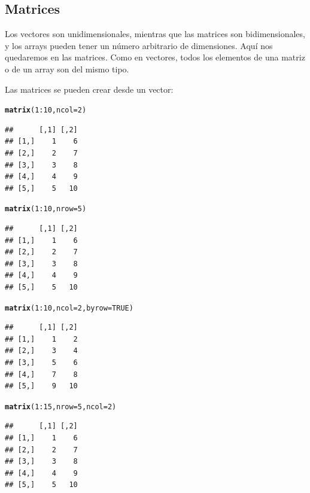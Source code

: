 \documentclass{config/apuntes}\usepackage[]{graphicx}\usepackage[]{xcolor}
\makeatletter
\newcommand{\hlnum}[1]{\textcolor[rgb]{0.686,0.059,0.569}{#1}}%
\newcommand{\hlopt}[1]{\textcolor[rgb]{0,0,0}{#1}}%
\newcommand{\hldef}[1]{\textcolor[rgb]{0.345,0.345,0.345}{#1}}%
\newcommand{\hlkwc}[1]{\textcolor[rgb]{0.333,0.667,0.333}{#1}}%
\newcommand{\hlkwd}[1]{\textcolor[rgb]{0.737,0.353,0.396}{\textbf{#1}}}%
\newenvironment{kframe}{%
 \def\at@end@of@kframe{}%
 \ifinner\ifhmode%
  \def\at@end@of@kframe{\end{minipage}}%
  \begin{minipage}{\columnwidth}%
 \fi\fi%
 \def\FrameCommand##1{\hskip\@totalleftmargin \hskip-\fboxsep
 \colorbox{shadecolor}{##1}\hskip-\fboxsep
     \hskip-\linewidth \hskip-\@totalleftmargin \hskip\columnwidth}%
 \MakeFramed {\advance\hsize-\width
   \@totalleftmargin\z@ \linewidth\hsize
   \@setminipage}}%
 {\par\unskip\endMakeFramed%
 \at@end@of@kframe}
\newenvironment{knitrout}{}{} %
\makeatother
\begin{document}
\subsection{Matrices}
Los vectores son unidimensionales, mientras que las matrices son bidimensionales, y los arrays pueden tener un número arbitrario de dimensiones. Aquí nos quedaremos en las matrices. Como en vectores, todos los elementos de una matriz o de un array son del mismo tipo. 

Las matrices se pueden crear desde un vector:
\begin{knitrout}
\color{fgcolor}\begin{kframe}
\begin{alltt}
\hlkwd{matrix}\hldef{(}\hlnum{1}\hlopt{:}\hlnum{10}\hldef{,} \hlkwc{ncol} \hldef{=} \hlnum{2}\hldef{)}
\end{alltt}
\begin{verbatim}
##      [,1] [,2]
## [1,]    1    6
## [2,]    2    7
## [3,]    3    8
## [4,]    4    9
## [5,]    5   10
\end{verbatim}
\begin{alltt}
\hlkwd{matrix}\hldef{(}\hlnum{1}\hlopt{:}\hlnum{10}\hldef{,} \hlkwc{nrow} \hldef{=} \hlnum{5}\hldef{)}
\end{alltt}
\begin{verbatim}
##      [,1] [,2]
## [1,]    1    6
## [2,]    2    7
## [3,]    3    8
## [4,]    4    9
## [5,]    5   10
\end{verbatim}
\begin{alltt}
\hlkwd{matrix}\hldef{(}\hlnum{1}\hlopt{:}\hlnum{10}\hldef{,} \hlkwc{ncol} \hldef{=} \hlnum{2}\hldef{,} \hlkwc{byrow} \hldef{=} \hlnum{TRUE}\hldef{)}
\end{alltt}
\begin{verbatim}
##      [,1] [,2]
## [1,]    1    2
## [2,]    3    4
## [3,]    5    6
## [4,]    7    8
## [5,]    9   10
\end{verbatim}
\begin{alltt}
\hlkwd{matrix}\hldef{(}\hlnum{1}\hlopt{:}\hlnum{15}\hldef{,} \hlkwc{nrow} \hldef{=} \hlnum{5}\hldef{,} \hlkwc{ncol} \hldef{=} \hlnum{2}\hldef{)}
\end{alltt}


{\ttfamily\noindent\color{warningcolor}{\#\# Warning in matrix(1:15, nrow = 5, ncol = 2): data length [15] is not a sub-multiple or multiple of the number of columns [2]}}\begin{verbatim}
##      [,1] [,2]
## [1,]    1    6
## [2,]    2    7
## [3,]    3    8
## [4,]    4    9
## [5,]    5   10
\end{verbatim}
\end{kframe}
\end{knitrout}
\end{document}
